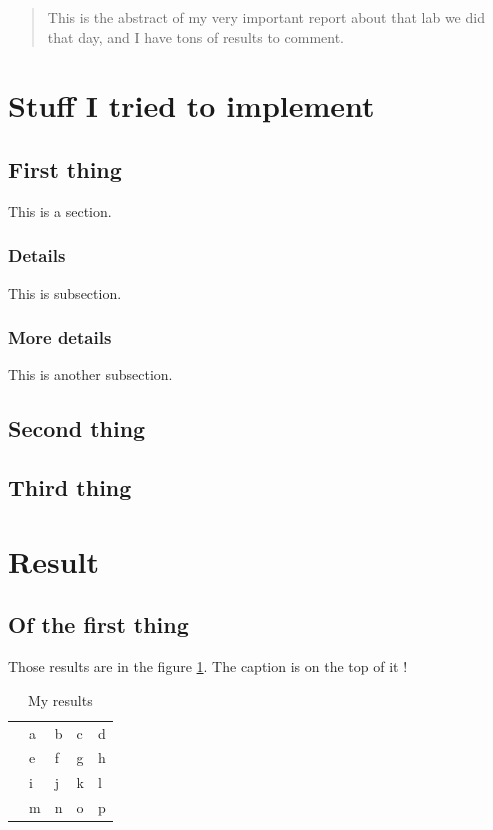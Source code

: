 \documentclass{cranfieldChart}
\begin{document}

\begin{abstract}
This is the abstract of my very important report about that lab we did that day, and I have tons of results to comment. 
\end{abstract}

\newpage
\tableofcontents
\newpage
\listoffigures
\newpage
\listoftables
\newpage
\section{Stuff I tried to implement}
\subsection{First thing}
This is a section.
\subsubsection{Details}
This is subsection.
\subsubsection{More details}
This is another subsection.
\subsection{Second thing}
\subsection{Third thing}
\newpage
\section{Result}
\subsection{Of the first thing}
Those results are in the figure \ref{resuts}. The caption is on the top of it !
\begin{table}[!h]
	\centering
	\caption{My results}
	\label{resuts}
	\begin{tabular}{lllll}
		& a  & b  & c & d \\
		& e & f & g & h \\
		& i & j & k & l \\
		& m & n & o & p
	\end{tabular}
\end{table}
\end{document}
